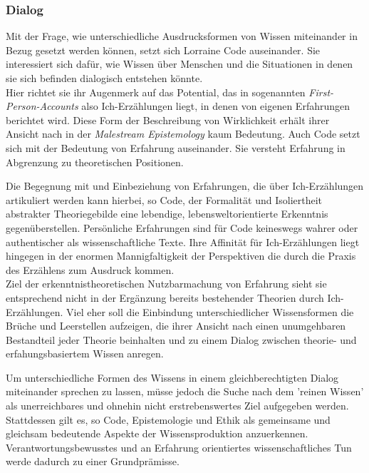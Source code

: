 \subsubsection{Dialog}

Mit der Frage, wie unterschiedliche Ausdrucksformen von Wissen miteinander
in Bezug gesetzt werden können, setzt sich Lorraine Code auseinander. Sie
interessiert sich dafür,  wie Wissen über Menschen und die  Situationen in
denen sie sich befinden dialogisch entstehen könnte.\\
 Hier richtet sie ihr
Augenmerk auf das Potential, das in sogenannten \textit{First-Person-Accounts} also
Ich-Erzählungen liegt, in denen von eigenen Erfahrungen berichtet wird. Diese
Form der Beschreibung von Wirklichkeit erhält ihrer Ansicht nach in der
\textit{Malestream Epistemology} kaum Bedeutung.\footnotemark {} Auch Code setzt sich mit der Bedeutung von Erfahrung auseinander. Sie versteht Erfahrung in Abgrenzung zu theoretischen Positionen. 


Die Begegnung mit und Einbeziehung von Erfahrungen, die über Ich-Erzählungen
artikuliert werden kann hierbei, so Code,  der Formalität und Isoliertheit
abstrakter Theoriegebilde eine lebendige, lebensweltorientierte Erkenntnis
gegenüberstellen. Persönliche Erfahrungen sind für Code keineswegs wahrer oder
authentischer als wissenschaftliche Texte. Ihre Affinität für Ich-Erzählungen
liegt hingegen in der enormen Mannigfaltigkeit der Perspektiven die durch die
Praxis des Erzählens zum Ausdruck kommen. \\
Ziel der erkenntnistheoretischen
Nutzbarmachung von Erfahrung sieht sie entsprechend nicht in der Ergänzung
bereits bestehender Theorien durch Ich-Erzählungen. Viel eher soll die
Einbindung unterschiedlicher Wissensformen die Brüche und Leerstellen aufzeigen,
die ihrer Ansicht nach einen unumgehbaren Bestandteil jeder Theorie beinhalten
und zu einem Dialog zwischen theorie- und erfahungsbasiertem Wissen anregen.

Um unterschiedliche Formen des Wissens in einem gleichberechtigten Dialog
miteinander sprechen zu lassen, müsse jedoch die Suche nach dem 'reinen Wissen'
als unerreichbares und ohnehin nicht erstrebenswertes Ziel aufgegeben
werden.\footnotemark {}\\
Stattdessen gilt es, so Code, Epistemologie und Ethik als gemeinsame und gleichsam bedeutende Aspekte der Wissensproduktion anzuerkennen. Verantwortungsbewusstes und an Erfahrung orientiertes wissenschaftliches Tun werde dadurch zu einer Grundprämisse.

